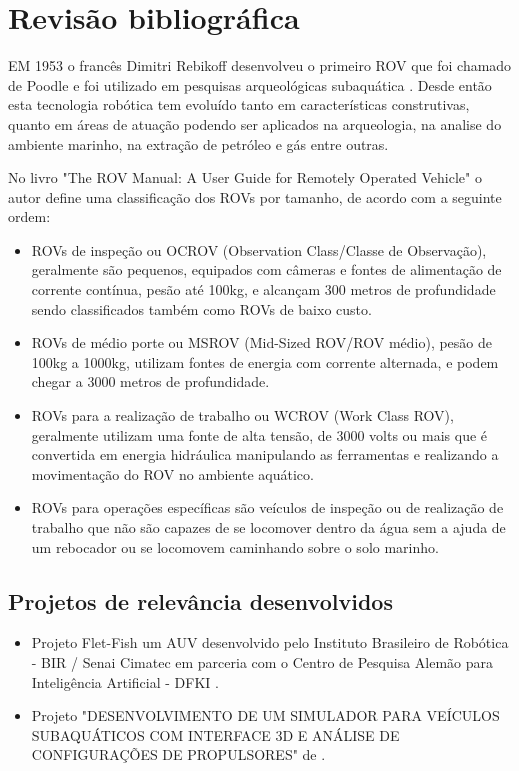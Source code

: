 \setcounter{equation}{0}
\chapter{Revisão bibliográfica}
EM 1953 o francês Dimitri Rebikoff desenvolveu o primeiro ROV que foi chamado de Poodle e foi utilizado em pesquisas arqueológicas subaquática \cite{6}. Desde então esta tecnologia robótica tem evoluído tanto em características construtivas, quanto em áreas de atuação podendo ser aplicados na arqueologia, na analise do ambiente marinho, na extração de petróleo e gás entre outras.

No livro "The ROV Manual: A User Guide for Remotely Operated Vehicle" o autor \cite{7} define uma classificação dos ROVs por tamanho, de acordo com a seguinte ordem:

\begin{itemize}

	\item ROVs de inspeção ou OCROV (Observation Class/Classe de Observação), geralmente são pequenos, equipados com câmeras e fontes de alimentação de corrente contínua, pesão até 100kg, e alcançam 300 metros de profundidade sendo classificados também como ROVs de baixo custo.
    \item ROVs de médio porte ou MSROV (Mid-Sized ROV/ROV médio), pesão de 100kg a 1000kg, utilizam fontes de energia com corrente alternada, e podem chegar a 3000 metros de profundidade.
	\item ROVs para a realização de trabalho ou WCROV (Work Class ROV), geralmente utilizam uma fonte de alta tensão, de 3000 volts ou mais que é convertida em energia hidráulica manipulando as ferramentas e realizando a movimentação do ROV no ambiente aquático.
	\item ROVs para operações específicas são veículos de inspeção ou de realização de trabalho que não são capazes de se locomover dentro da água sem a ajuda de um rebocador ou se locomovem caminhando sobre o solo marinho.

\end{itemize}



\section{Projetos de relevância desenvolvidos}
\begin{itemize}

	\item Projeto Flet-Fish um AUV desenvolvido pelo Instituto Brasileiro de Robótica - BIR / Senai Cimatec em parceria com o Centro de Pesquisa Alemão para Inteligência Artificial - DFKI \cite{5}.
	\item Projeto "DESENVOLVIMENTO DE UM SIMULADOR PARA VEÍCULOS SUBAQUÁTICOS COM INTERFACE 3D E ANÁLISE DE CONFIGURAÇÕES DE PROPULSORES" de \cite{6}.

\end{itemize}



 
